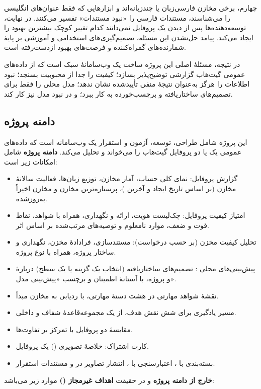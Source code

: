 \documentclass[12pt]{article}
\begin{document}
 چهارم، برخی مخازن فارسی‌زبان یا چندزبانه‌اند و ابزارهایی که فقط عنوان‌های انگلیسی  را می‌شناسند، مستندات فارسی را «نبود مستندات» تفسیر می‌کنند. در نهایت، توسعه‌دهنده‌ها پس از دیدن یک پروفایل نمی‌دانند کدام تغییر کوچک بیشترین بهبود را ایجاد می‌کند. پیامد حل‌نشدن این مسئله، تصمیم‌گیری‌های استخدامی و آموزشی بر پایهٔ شمارنده‌های گمراه‌کننده و فرصت‌های بهبود ازدست‌رفته است.

 در نتیجه، مسئلهٔ اصلی این پروژه ساخت یک وب‌سامانهٔ سبک است که از داده‌های عمومی گیت‌هاب گزارشی توضیح‌پذیر بسازد؛ کیفیت را جدا از محبوبیت بسنجد؛ نبود اطلاعات را هرگز به‌عنوان نتیجهٔ منفی تأییدشده نشان ندهد؛ مدل محلی را فقط برای تصمیم‌های ساختاریافته و برچسب‌خورده به کار ببرد؛ و در نبود مدل نیز کار کند.
\subsection{دامنه پروژه}
 این پروژه شامل طراحی، توسعه، آزمون و استقرار یک وب‌سامانه است که داده‌های عمومی یک یا دو پروفایل گیت‌هاب را می‌خواند و تحلیل می‌کند. \textbf{دامنه پروژه} شامل امکانات زیر است:

 \begin{itemize}
\item گزارش پروفایل: نمای کلی حساب، آمار مخازن، توزیع زبان‌ها، فعالیت سالانهٔ مخازن (بر اساس تاریخ ایجاد و آخرین )، پرستاره‌ترین مخازن و مخازن اخیراً به‌روزشده.
\item امتیاز کیفیت پروفایل: چک‌لیست هویت، ارائه و نگهداری، همراه با شواهد، نقاط قوت و ضعف، موارد نامعلوم و توصیه‌های مرتب‌شده بر اساس اثر.
\item تحلیل کیفیت مخزن (بر حسب درخواست): مستندسازی، فرادادهٔ مخزن، نگهداری و ساختار پروژه، همراه با نوع پروژه.
\item پیش‌بینی‌های محلی : تصمیم‌های ساختاریافته (انتخاب یک گزینه یا یک سطح) دربارهٔ  و پروژه، با آستانهٔ اطمینان و برچسب «پیش‌بینی مدل».
\item نقشهٔ شواهد مهارتی در هشت دستهٔ مهارتی، با ردیابی به مخازن مبدأ.
\item مسیر یادگیری برای شش نقش هدف، از یک مجموعه‌قاعدهٔ شفاف و داخلی.
\item مقایسهٔ دو پروفایل با تمرکز بر تفاوت‌ها.
\item کارت اشتراک: خلاصهٔ تصویری () یک پروفایل.
\item بسته‌بندی با ، اعتبارسنجی با ، انتشار تصاویر در  و مستندات استقرار.
\end{itemize}
 \textbf{خارج از دامنه پروژه} و در حقیقت \textbf{اهداف غیرمجاز ()} موارد زیر می‌باشد:
\end{document}
